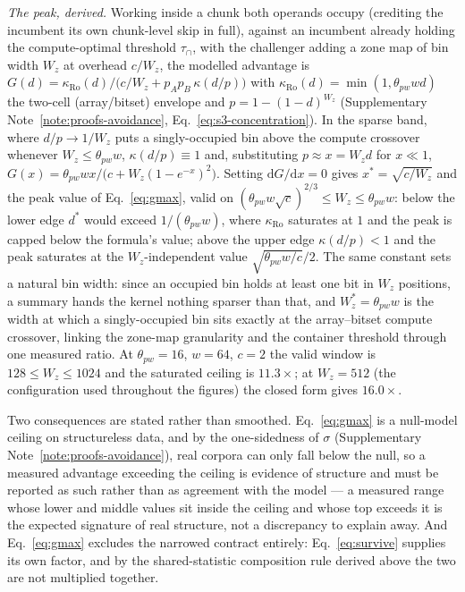 \emph{The peak, derived.} Working inside a chunk both operands occupy (crediting the incumbent its own
chunk-level skip in full), against an incumbent already holding the compute-optimal threshold
$\tau_\cap$, with the challenger adding a zone map of bin width $W_z$ at overhead $c/W_z$, the modelled
advantage is $G(d)=\kappa_{\mathrm{Ro}}(d)/\big(c/W_z+p_Ap_B\,\kappa(d/p)\big)$ with
$\kappa_{\mathrm{Ro}}(d)=\min(1,\theta_{pw}wd)$ the two-cell (array/bitset) envelope and $p=1-(1-d)^{W_z}$
(Supplementary Note~\ref{note:proofs-avoidance}, Eq.~\eqref{eq:s3-concentration}). In the sparse band, where $d/p\to1/W_z$ puts a
singly-occupied bin above the compute crossover whenever $W_z\le\theta_{pw}w$, $\kappa(d/p)\equiv1$ and,
substituting $p\approx x=W_zd$ for $x\ll1$, $G(x)=\theta_{pw}wx/\big(c+W_z(1-e^{-x})^2\big)$. Setting
$\mathrm dG/\mathrm dx=0$ gives $x^*=\sqrt{c/W_z}$ and the peak value of Eq.~\eqref{eq:gmax}, valid on
$(\theta_{pw}w\sqrt c)^{2/3}\le W_z\le\theta_{pw}w$: below the lower edge $d^*$ would exceed
$1/(\theta_{pw}w)$, where $\kappa_{\mathrm{Ro}}$ saturates at $1$ and the peak is capped below the
formula's value; above the upper edge $\kappa(d/p)<1$ and the peak saturates at the $W_z$-independent
value $\sqrt{\theta_{pw}w/c}/2$. The same constant sets a natural bin width: since an occupied bin holds
at least one bit in $W_z$ positions, a summary hands the kernel nothing sparser than that, and
$W_z^*=\theta_{pw}w$ is the width at which a singly-occupied bin sits exactly at the array--bitset
compute crossover, linking the zone-map granularity and the container threshold through one measured
ratio. At $\theta_{pw}=16$, $w=64$, $c=2$ the valid window is $128\le W_z\le1024$ and the saturated
ceiling is $11.3\times$; at $W_z=512$ (the configuration used throughout the figures) the closed form
gives $16.0\times$.

Two consequences are stated rather than smoothed. Eq.~\eqref{eq:gmax} is a null-model ceiling
on structureless data, and by the one-sidedness of $\sigma$ (Supplementary Note~\ref{note:proofs-avoidance}), real corpora can
only fall below the null, so a measured advantage exceeding the ceiling is evidence of structure and
must be reported as such rather than as agreement with the model --- a measured range whose lower and
middle values sit inside the ceiling and whose top exceeds it is the expected signature of real
structure, not a discrepancy to explain away. And Eq.~\eqref{eq:gmax} excludes the narrowed contract
entirely: Eq.~\eqref{eq:survive} supplies its own factor, and by the shared-statistic composition rule
derived above the two are not
multiplied together.
